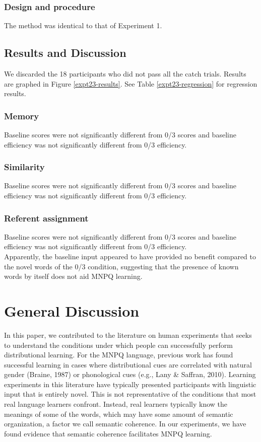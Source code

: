 \documentclass[man,floatsintext]{apa6}
\begin{document}
\subsubsection{Design and procedure}
The method was identical to that of Experiment 1.

\subsection{Results and Discussion}
We discarded the 18 participants who did not pass all the catch trials. Results are graphed in Figure \ref{expt23-results}. See Table \ref{expt23-regression} for regression results.

\subsubsection{Memory}
Baseline scores were not significantly different from 0/3 scores and baseline efficiency was not significantly different from 0/3 efficiency.

\subsubsection{Similarity}
Baseline scores were not significantly different from 0/3 scores and baseline efficiency was not significantly different from 0/3 efficiency.

\subsubsection{Referent assignment}
Baseline scores were not significantly different from 0/3 scores and baseline efficiency was not significantly different from 0/3 efficiency.\\

Apparently, the baseline input appeared to have provided no benefit compared to the novel words of the 0/3 condition, suggesting that the presence of known words by itself does not aid MNPQ learning.

\section{General Discussion}

In this paper, we contributed to the literature on human experiments that seeks to understand the conditions under which people can successfully perform distributional learning. For the MNPQ language, previous work has found successful learning in cases where distributional cues are correlated with natural gender (Braine, 1987) or phonological cues (e.g., Lany \& Saffran, 2010). Learning experiments in this literature have typically presented participants with linguistic input that is entirely novel. This is not representative of the conditions that most real language learners confront. Instead, real learners typically know the meanings of some of the words, which may have some amount of semantic organization, a factor we call semantic coherence. In our experiments, we have found evidence that semantic coherence facilitates MNPQ learning.
\end{document}
